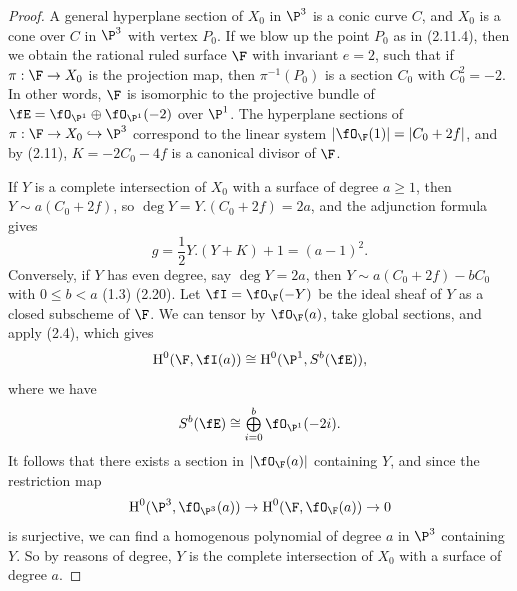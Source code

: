 \documentclass[a4paper]{article}
\begin{document}
\begin{enumerate} [label=\textbf{\arabic*.}, leftmargin=0em]
          \begin{proof}
              A general hyperplane section of $X_0$ in $\P^3$ is a conic curve $C$, and $X_0$ is a cone over $C$ in $\P^3$ with vertex $P_0$.
              If we blow up the point $P_0$ as in (2.11.4), then we obtain the rational ruled surface $\F$ with invariant $e = 2$, such that if $\pi : \F \to X_0$ is the projection map, then $\pi^{-1}(P_0)$ is a section $C_0$ with $C_0^2 = -2$.
              In other words, $\F$ is isomorphic to the projective bundle of $\fE = \fO_{\P^1} \oplus \fO_{\P^1}(-2)$ over $\P^1$.
              The hyperplane sections of $\pi : \F \to X_0 \hookrightarrow \P^3$ correspond to the linear system $|\fO_\F(1)| = |C_0 + 2f|$, and by (2.11), $K = -2C_0 - 4f$ is a canonical divisor of $\F$.

              If $Y$ is a complete intersection of $X_0$ with a surface of degree $a \geq 1$, then $Y \sim a(C_0 + 2f)$, so $\deg{Y} = Y.(C_0 + 2f) = 2a$, and the adjunction formula gives
              \begin{equation*}
                  g = \frac{1}{2}Y.(Y + K) + 1 = (a - 1)^2.
              \end{equation*}
              Conversely, if $Y$ has even degree, say $\deg{Y} = 2a$, then $Y \sim a(C_0 + 2f) - bC_0$ with $0 \leq b < a$ (1.3) (2.20).
              Let $\fI = \fO_\F(-Y)$ be the ideal sheaf of $Y$ as a closed subscheme of $\F$.
              We can tensor by $\fO_\F(a)$, take global sections, and apply (2.4), which gives
              \begin{equation*}
                  \cH^0(\F, \fI(a)) \cong \cH^0(\P^1, S^b(\fE)),
              \end{equation*}
              where we have
              \begin{equation*}
                  S^b(\fE) \cong \bigoplus_{i = 0}^b \fO_{\P^1}(-2i).
              \end{equation*}
              It follows that there exists a section in $|\fO_\F(a)|$ containing $Y$, and since the restriction map $$\cH^0(\P^3, \fO_{\P^3}(a)) \to \cH^0(\F, \fO_\F(a)) \to 0$$ is surjective, we can find a homogenous polynomial of degree $a$ in $\P^3$ containing $Y$.
              So by reasons of degree, $Y$ is the complete intersection of $X_0$ with a surface of degree $a$.


\end{proof}
\end{enumerate}
\end{document}
